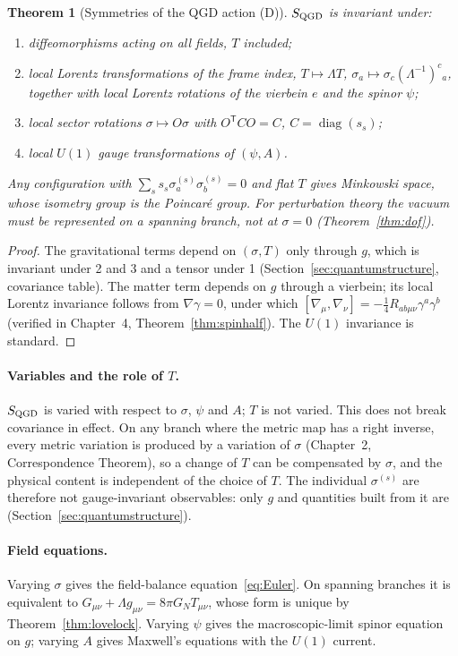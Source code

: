 \documentclass[11pt,a4paper]{article}
\newtheorem{theorem}{Theorem}[section]
\begin{document}
\begin{theorem}[Symmetries of the QGD action (D)]\label{thm:qgdsym}
$S_{\rm QGD}$ is invariant under:
\begin{enumerate}
\item diffeomorphisms acting on all fields, $T$ included;
\item local Lorentz transformations of the frame index, $T\mapsto\Lambda T$,
$\sigma_a\mapsto\sigma_c(\Lambda^{-1})^c{}_a$, together with local Lorentz rotations of the vierbein
$e$ and the spinor $\psi$;
\item local sector rotations $\sigma\mapsto O\sigma$ with $O^{\mathsf T}CO=C$, $C=\operatorname{diag}(s_s)$;
\item local $U(1)$ gauge transformations of $(\psi,A)$.
\end{enumerate}
Any configuration with $\sum_ss_s\sigma^{(s)}_a\sigma^{(s)}_b=0$ and flat $T$ gives Minkowski space,
whose isometry group is the Poincar\'e group. For perturbation theory the vacuum must be
represented on a spanning branch, not at $\sigma=0$ (Theorem~\ref{thm:dof}).
\end{theorem}
\begin{proof}
The gravitational terms depend on $(\sigma,T)$ only through $g$, which is invariant under
2 and 3 and a tensor under 1 (Section~\ref{sec:quantumstructure}, covariance table). The
matter term depends on $g$ through a vierbein; its local Lorentz invariance follows from
$\nabla\gamma=0$, under which $[\nabla_\mu,\nabla_\nu]=-\frac14R_{ab\mu\nu}\gamma^a\gamma^b$ (verified in
Chapter~4, Theorem~\ref{thm:spinhalf}). The $U(1)$ invariance is standard.
\end{proof}

\paragraph{Variables and the role of $T$.} $S_{\rm QGD}$ is varied with respect to
$\sigma$, $\psi$ and $A$; $T$ is not varied. This does not break covariance in effect. On
any branch where the metric map has a right inverse, every metric variation is produced by
a variation of $\sigma$ (Chapter~2, Correspondence Theorem), so a change of $T$ can be
compensated by $\sigma$, and the physical content is independent of the choice of $T$.
The individual $\sigma^{(s)}$ are therefore not gauge-invariant observables: only $g$ and
quantities built from it are (Section~\ref{sec:quantumstructure}).

\paragraph{Field equations.} Varying $\sigma$ gives the field-balance
equation~\eqref{eq:Euler}. On spanning branches it is equivalent to
$G_{\mu\nu}+\Lambda g_{\mu\nu}=8\pi G_NT_{\mu\nu}$, whose form is unique by
Theorem~\ref{thm:lovelock}. Varying $\psi$ gives the macroscopic-limit spinor equation on $g$;
varying $A$ gives Maxwell's equations with the $U(1)$ current.
\end{document}
